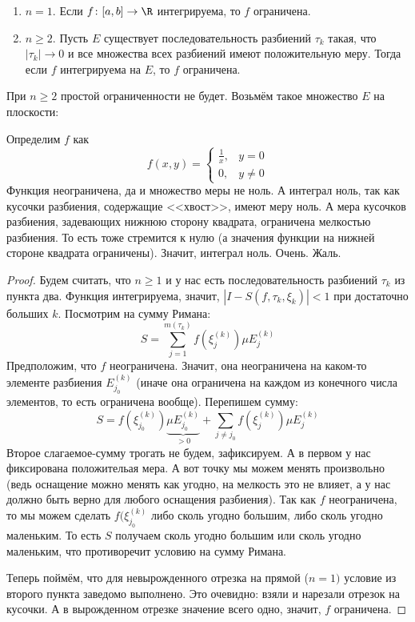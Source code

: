 \begin{theorem}
	\begin{enumerate}
	\item $n=1$. Если $f \colon [a,b] \to \R$ интегрируема, то $f$ ограничена.
	\item
		$n \ge 2$. Пусть $E$ существует последовательность разбиений $\tau_k$ такая, что
		$|\tau_k| \to 0$ и все множества всех разбиений имеют положительную меру.
		Тогда если $f$ интегрируема на $E$, то $f$ ограничена.
	\end{enumerate}
\end{theorem}
\begin{Rem}
	При $n \ge 2$ простой ограниченности не будет.
	Возьмём такое множество $E$ на плоскости:
	\begin{center}
	
	\end{center}
	Определим $f$ как
	\[
		f(x, y) =
		\begin{cases}
			\frac 1 x, & y=0\\
			0,         & y\neq 0
		\end{cases}
	\]
	Функция неограничена, да и множество меры не ноль.
	А интеграл ноль, так как кусочки разбиения, содержащие <<хвост>>, имеют меру ноль.
	А мера кусочков разбиения, задевающих нижнюю сторону квадрата, ограничена мелкостью разбиения.
	То есть тоже стремится к нулю (а значения функции на нижней стороне квадрата ограничены).
	Значит, интеграл ноль.
	Очень. Жаль.
\end{Rem}
\begin{proof}
	Будем считать, что $n\ge 1$ и у нас есть последовательность разбиений $\tau_k$ из пункта два.
	Функция интегрируема, значит, $|I-S(f,\tau_k,\xi_k)|<1$ при достаточно больших $k$.
	Посмотрим на сумму Римана:
	\[
		S=\sum_{j=1}^{m(\tau_k)} f(\xi_j^{(k)}) \mu E_j^{(k)}
	\]
	Предположим, что $f$ неограничена.
	Значит, она неограничена на каком-то элементе разбиения $E_{j_0}^{(k)}$
	(иначе она ограничена на каждом из конечного числа элементов, то есть ограничена вообще).
	Перепишем сумму:
	\[
		S=f(\xi_{j_0}^{(k)}) \underbrace{\mu E_{j_0}^{(k)}}_{>0} + \sum_{j\neq j_0} f(\xi_j^{(k)}) \mu E_j^{(k)}
	\]
	Второе слагаемое-сумму трогать не будем, зафиксируем.
	А в первом у нас фиксирована положительая мера.
	А вот точку мы можем менять произвольно (ведь оснащение можно менять как угодно, на мелкость это не влияет,
	а у нас должно быть верно для любого оснащения разбиения).
	Так как $f$ неограничена, то мы можем сделать $f(\xi_{j_0}^{(k)}$ либо сколь угодно большим,
	либо сколь угодно маленьким.
	То есть $S$ получаем сколь угодно большим или сколь угодно маленьким, что противоречит условию на сумму Римана.

	Теперь поймём, что для невырожденного отрезка на прямой ($n=1)$ условие из второго пункта заведомо выполнено.
	Это очевидно: взяли и нарезали отрезок на кусочки.
	А в вырожденном отрезке значение всего одно, значит, $f$ ограничена.
\end{proof}
